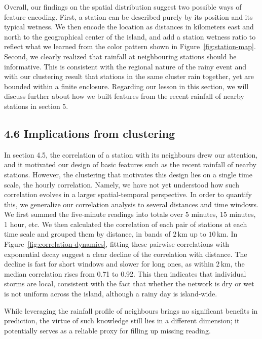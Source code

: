 \documentclass[11pt,a4paper]{article}
\begin{document}
Overall, our findings on the spatial distribution suggest two possible ways of feature encoding. First, a station can be described purely by its position and its typical wetness. We then encode the location as distances in kilometers east and north to the geographical center of the island, and add a station wetness ratio to reflect what we learned from the color pattern shown in Figure~\ref{fig:station-map}. Second, we clearly realized that rainfall at neighbouring stations should be informative. This is consistent with the regional nature of the rainy event and with our clustering result that stations in the same cluster rain together, yet are bounded within a finite enclosure. Regarding our lesson in this section, we will discuss further about how we built features from the recent rainfall of nearby stations in section 5.


\subsection*{4.6 Implications from clustering}
{}


In section 4.5, the correlation of a station with its neighbours drew our attention, and it motivated our design of basic features such as the recent rainfall of nearby stations. However, the clustering that motivates this design lies on a single time scale, the hourly correlation. Namely, we have not yet understood how such correlation evolves in a larger spatial-temporal perspective. In order to quantify this, we generalize our correlation analysis to several distances and time windows. We first summed the five-minute readings into totals over 5 minutes, 15 minutes, 1 hour, etc. We then calculated the correlation of each pair of stations at each time scale and grouped them by distance, in bands of \(2\,\mathrm{km}\) up to \(10\,\mathrm{km}\). In Figure~\ref{fig:correlation-dynamics}, fitting these pairwise correlations with exponential decay suggest a clear decline of the correlation with distance. The decline is fast for short windows and slower for long ones, as within \(2\,\mathrm{km}\), the median correlation rises from 0.71 to 0.92. This then indicates that individual storms are local, consistent with the fact that whether the network is dry or wet is not uniform across the island, although a rainy day is island-wide. 


While leveraging the rainfall profile of neighbours brings no significant benefits in prediction, the virtue of such knowledge still lies in a different dimension; it potentially serves as a reliable proxy for filling up missing reading.                                        
\end{document}
